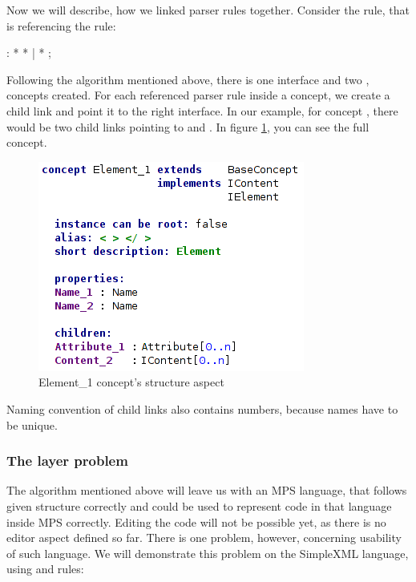 Now we will describe, how we linked parser rules together.
Consider the  rule, that is referencing the  rule:

\begin{antlr}
	    :   \literal{<}  * \literal{>} * \literal{</}  \literal{>}
           |   \literal{<}  * \literal{/>}
           ;
\end{antlr}

Following the algorithm mentioned above, there is one  interface and two ,  concepts created.
For each referenced parser rule inside a concept, we create a child link and point it to the right interface.
In our example, for concept , there would be two child links pointing to  and .
In figure \ref{fig:element_concept_full}, you can see the full  concept.

\begin{figure}[h]
	\centering
	\includegraphics[scale=0.7]{./img/element_concept_full.png}
	\caption{Element{\_}1 concept's structure aspect}
	\label{fig:element_concept_full}
\end{figure}

Naming convention of child links also contains numbers, because names have to be unique.

\subsubsection{The layer problem}
\label{chap:layer_problem}

The algorithm mentioned above will leave us with an MPS language, that follows given structure correctly and could be used to represent code in that language inside MPS correctly. Editing the code will not be possible yet, as there is no editor aspect defined so far.
There is one problem, however, concerning usability of such language.
We will demonstrate this problem on the SimpleXML language, using  and  rules:

